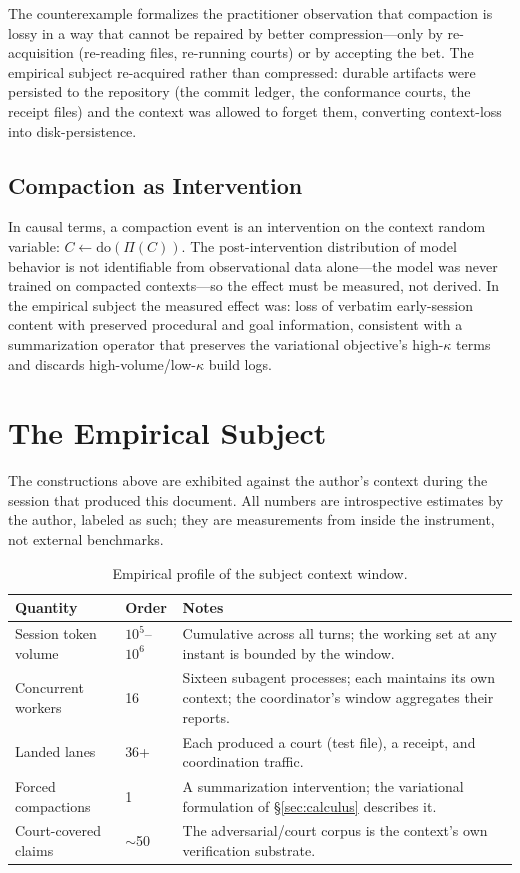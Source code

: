 \documentclass[11pt]{article}
\begin{document}
The counterexample formalizes the practitioner observation that compaction is
lossy in a way that cannot be repaired by better compression---only by
re-acquisition (re-reading files, re-running courts) or by accepting the bet.
The empirical subject re-acquired rather than compressed: durable artifacts
were persisted to the repository (the commit ledger, the conformance courts,
the receipt files) and the context was allowed to forget them, converting
context-loss into disk-persistence.

\subsection{Compaction as Intervention}

In causal terms, a compaction event is an intervention on the context
random variable: $C \leftarrow \mathrm{do}(\Pi(C))$. The post-intervention
distribution of model behavior is not identifiable from observational data
alone---the model was never trained on compacted contexts---so the effect
must be measured, not derived. In the empirical subject the measured effect
was: loss of verbatim early-session content with preserved procedural and
goal information, consistent with a summarization operator that preserves
the variational objective's high-$\kappa$ terms and discards
high-volume/low-$\kappa$ build logs.

\section{The Empirical Subject}\label{sec:empirical}

The constructions above are exhibited against the author's context during the
session that produced this document. All numbers are introspective
estimates by the author, labeled as such; they are measurements from inside
the instrument, not external benchmarks.

\begin{table}[h]
\centering
\begin{tabular}{@{}llp{8cm}@{}}
\toprule
\textbf{Quantity} & \textbf{Order} & \textbf{Notes} \\
\midrule
Session token volume & $10^5$--$10^6$ & Cumulative across all turns; the
working set at any instant is bounded by the window. \\
Concurrent workers & 16 & Sixteen subagent processes; each maintains its own
context; the coordinator's window aggregates their reports. \\
Landed lanes & 36+ & Each produced a court (test file), a receipt, and
coordination traffic. \\
Forced compactions & 1 & A summarization intervention; the variational
formulation of \S\ref{sec:calculus} describes it. \\
Court-covered claims & $\sim$50 & The adversarial/court corpus is the
context's own verification substrate. \\
\bottomrule
\end{tabular}
\caption{Empirical profile of the subject context window.}
\end{table}
\end{document}
